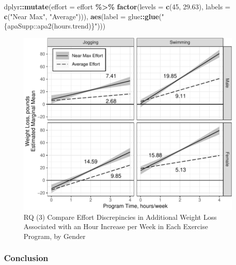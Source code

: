 \documentclass[
]{article}
\newenvironment{Shaded}{\begin{snugshade}}{\end{snugshade}}
\newcommand{\AttributeTok}[1]{\textcolor[rgb]{0.13,0.29,0.53}{#1}}
\newcommand{\DecValTok}[1]{\textcolor[rgb]{0.00,0.00,0.81}{#1}}
\newcommand{\FloatTok}[1]{\textcolor[rgb]{0.00,0.00,0.81}{#1}}
\newcommand{\FunctionTok}[1]{\textcolor[rgb]{0.13,0.29,0.53}{\textbf{#1}}}
\newcommand{\NormalTok}[1]{#1}
\newcommand{\SpecialCharTok}[1]{\textcolor[rgb]{0.81,0.36,0.00}{\textbf{#1}}}
\newcommand{\StringTok}[1]{\textcolor[rgb]{0.31,0.60,0.02}{#1}}
\begin{document}
\begin{Shaded}
\begin{Highlighting}[]
\NormalTok{              dplyr}\SpecialCharTok{::}\FunctionTok{mutate}\NormalTok{(}\AttributeTok{effort =}\NormalTok{ effort }\SpecialCharTok{\%\textgreater{}\%} 
                              \FunctionTok{factor}\NormalTok{(}\AttributeTok{levels =} \FunctionTok{c}\NormalTok{(}\DecValTok{45}\NormalTok{, }\FloatTok{29.63}\NormalTok{),}
                                     \AttributeTok{labels =} \FunctionTok{c}\NormalTok{(}\StringTok{"Near Max"}\NormalTok{,}
                                                \StringTok{"Average"}\NormalTok{))),}
            \FunctionTok{aes}\NormalTok{(}\AttributeTok{label =}\NormalTok{ glue}\SpecialCharTok{::}\FunctionTok{glue}\NormalTok{(}\StringTok{"\{apaSupp::apa2(hours.trend)\}"}\NormalTok{)))}
\end{Highlighting}
\end{Shaded}

\begin{figure}[hb]

\includegraphics{Appendix_ex_weightloss_files/figure-latex/unnamed-chunk-101-1} \hfill{}

\caption{RQ (3) Compare Effort Discrepincies in Additional Weight Loss Associated with an Hour Increase per Week in Each Exercise Program, by Gender}\label{fig:unnamed-chunk-101}
\end{figure}

\clearpage

\hypertarget{conclusion-2}{%
\subsubsection{Conclusion}\label{conclusion-2}}
\end{document}
